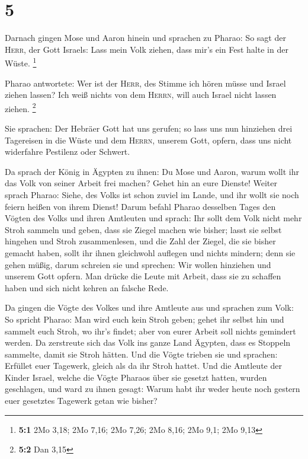 \hypertarget{section-1}{%
\section{5}\label{section-1}}

 Darnach gingen Mose und Aaron hinein und sprachen zu
Pharao: So sagt der \textsc{Herr}, der Gott Israels: Lass mein Volk
ziehen, dass mir's ein Fest halte in der Wüste. \footnote{\textbf{5:1}
  2Mo 3,18; 2Mo 7,16; 2Mo 7,26; 2Mo 8,16; 2Mo 9,1; 2Mo 9,13}

 Pharao antwortete: Wer ist der \textsc{Herr}, des Stimme
ich hören müsse und Israel ziehen lassen? Ich weiß nichts von dem
\textsc{Herrn}, will auch Israel nicht lassen ziehen. \footnote{\textbf{5:2}
  Dan 3,15}

 Sie sprachen: Der Hebräer Gott hat uns gerufen; so lass
uns nun hinziehen drei Tagereisen in die Wüste und dem \textsc{Herrn},
unserem Gott, opfern, dass uns nicht widerfahre Pestilenz oder Schwert.

 Da sprach der König in Ägypten zu ihnen: Du Mose und
Aaron, warum wollt ihr das Volk von seiner Arbeit frei machen? Gehet hin
an eure Dienste!  Weiter sprach Pharao: Siehe, des Volks
ist schon zuviel im Lande, und ihr wollt sie noch feiern heißen von
ihrem Dienst!  Darum befahl Pharao desselben Tages den
Vögten des Volks und ihren Amtleuten und sprach:  Ihr
sollt dem Volk nicht mehr Stroh sammeln und geben, dass sie Ziegel
machen wie bisher; lasst sie selbst hingehen und Stroh zusammenlesen,
 und die Zahl der Ziegel, die sie bisher gemacht haben,
sollt ihr ihnen gleichwohl auflegen und nichts mindern; denn sie gehen
müßig, darum schreien sie und sprechen: Wir wollen hinziehen und unserem
Gott opfern.  Man drücke die Leute mit Arbeit, dass sie zu
schaffen haben und sich nicht kehren an falsche Rede.

 Da gingen die Vögte des Volkes und ihre Amtleute aus und
sprachen zum Volk: So spricht Pharao: Man wird euch kein Stroh geben;
 gehet ihr selbst hin und sammelt euch Stroh, wo ihr's
findet; aber von eurer Arbeit soll nichts gemindert werden.
 Da zerstreute sich das Volk ins ganze Land Ägypten, dass
es Stoppeln sammelte, damit sie Stroh hätten.  Und die
Vögte trieben sie und sprachen: Erfüllet euer Tagewerk, gleich als da
ihr Stroh hattet.  Und die Amtleute der Kinder Israel,
welche die Vögte Pharaos über sie gesetzt hatten, wurden geschlagen, und
ward zu ihnen gesagt: Warum habt ihr weder heute noch gestern euer
gesetztes Tagewerk getan wie bisher?

